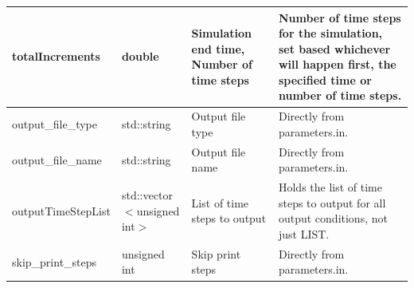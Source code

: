 \documentclass[10pt]{article} %
\begin{document}
\begin{center}
\begin{tabular}{ | p{} | p{} |p{} | p{} |}
         totalIncrements & double & Simulation end time, Number of time steps & Number of time steps for the simulation, set based whichever will happen first, the specified time or number of time steps. \\ \hline
          output\_file\_type & std::string & Output file type & Directly from parameters.in. \\ \hline
          output\_file\_name & std::string & Output file name & Directly from parameters.in. \\ \hline
          outputTimeStepList & std::vector$<$unsigned int$>$ & List of time steps to output & Holds the list of time steps to output for all output conditions, not just LIST. \\ \hline
          skip\_print\_steps & unsigned int & Skip print steps & Directly from parameters.in. \\ \hline
         
    \end{tabular}
\end{center}
\end{document}
